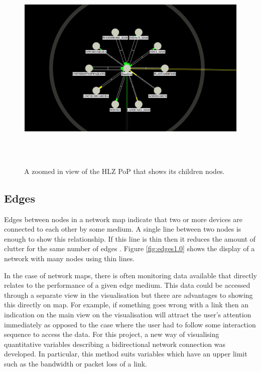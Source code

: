 \documentclass[11pt, a4paper]{article}
\begin{document}
\begin{figure}
\centering
\includegraphics[width=170mm,height=101.93mm]{assets/nodes1-1.eps}
\caption{A zoomed in view of the HLZ PoP that shows its children nodes.}
\label{fig:nodes1.1}
\end{figure}

\subsection{Edges}
\label{sec:edges.vis}

Edges between nodes in a network map indicate that two or more devices are
connected to each other by some medium. A single line between two nodes is
enough to show this relationship. If this line is thin then it reduces the
amount of clutter for the same number of edges \cite{Tufte_2007}. Figure
\ref{fig:edges1.0} shows the display of a network with many nodes using thin
lines.

In the case of network maps, there is often monitoring data available that
directly relates to the performance of a given edge medium. This data could be
accessed through a separate view in the visualisation but there are advantages
to showing this directly on map. For example, if something goes wrong with a
link then an indication on the main view on the visualisation will attract the
user's attention immediately as opposed to the case where the user had to follow
some interaction sequence to access the data. For this project, a new way of
visualising quantitative variables describing a bidirectional network connection
was developed. In particular, this method suits variables which have an upper
limit such as the bandwidth or packet loss of a link.
\end{document}
